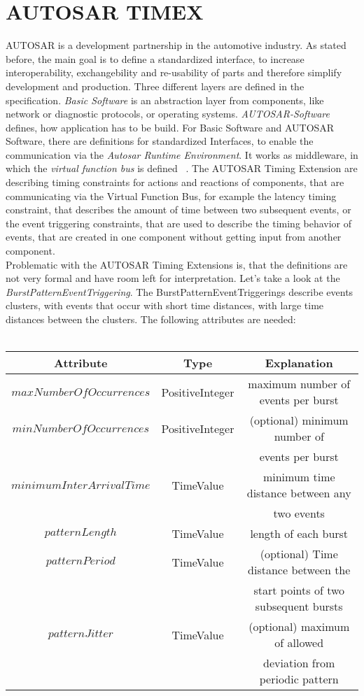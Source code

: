 \section{AUTOSAR TIMEX}
AUTOSAR is a development partnership in the automotive industry. As stated before, the main goal is to define a standardized interface, to increase interoperability, exchangebility and re-usability of parts and therefore simplify development and production. Three different layers are defined in the specification. \emph{Basic Software} is an abstraction layer from components, like network or diagnostic protocols, or operating systems. \emph{AUTOSAR-Software} defines, how application has to be build. For Basic Software and AUTOSAR Software, there are definitions for standardized Interfaces, to enable the communication via the \emph{Autosar Runtime Environment}. It works as middleware, in which the \emph{virtual function bus} is defined ~\cite{Virtual_Functional_Bus}.
The AUTOSAR Timing Extension are describing timing constraints for actions and reactions of components, that are communicating via the Virtual Function Bus, for example the latency timing constraint, that describes the amount of time between two subsequent events, or the event triggering constraints, that are used to describe the timing behavior of events, that are created in one component without getting input from another component.\\
Problematic with the AUTOSAR Timing Extensions is, that the definitions are not very formal and have room left for interpretation. Let's take a look at the \emph{BurstPatternEventTriggering}. The BurstPatternEventTriggerings describe events clusters, with events that occur with short time distances, with large time distances between the clusters. The following attributes are needed:\\ \\
\begin{tabular}{|c|c|c|}
	\hline
	\textbf{Attribute} & \textbf{Type} & \textbf{Explanation} \\
	\hline
	$maxNumberOfOccurrences$ & PositiveInteger & maximum number of events per burst\\
	\hline
	$minNumberOfOccurrences$ & PositiveInteger & (optional) minimum number of\\
						   &				 & events per burst\\
	\hline
	$minimumInterArrivalTime$ & TimeValue & minimum time distance between any\\
							&			& two events\\
	\hline
	$patternLength$ & TimeValue &  length of each burst\\
	\hline
	$patternPeriod$ & TimeValue & (optional) Time distance between the\\
	 			  &			  & start points of two subsequent bursts\\
	\hline
	$patternJitter$ & TimeValue & (optional) maximum of allowed\\
    			  &			  & deviation from periodic pattern\\
	\hline
\end{tabular}\\ \\ \\

